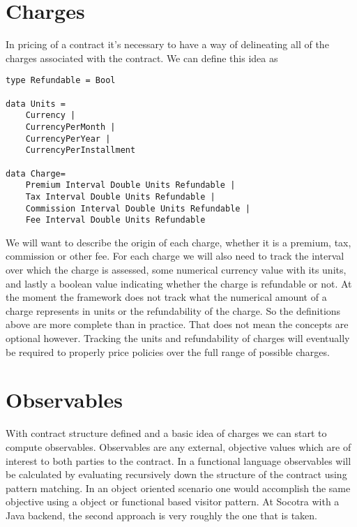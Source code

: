\section{Charges}
\label{sec:01:2}
In pricing of a contract it's necessary to have a way of delineating all of the charges associated with the contract. We can
define this idea as
\begin{lstlisting}
type Refundable = Bool

data Units = 
    Currency | 
    CurrencyPerMonth | 
    CurrencyPerYear | 
    CurrencyPerInstallment

data Charge= 
    Premium Interval Double Units Refundable |
    Tax Interval Double Units Refundable |
    Commission Interval Double Units Refundable |
    Fee Interval Double Units Refundable
\end{lstlisting}
We will want to describe the origin of each charge, whether it is a premium, tax, commission or other
fee. For each charge we will also need to track the
interval over which the charge is assessed, some numerical currency value with its units, and lastly a boolean value
indicating whether the charge is refundable or not. At the moment the framework does not track what the numerical
amount of a charge represents in units or the refundability of the charge. So the definitions above are more
complete than in practice. That does not mean the concepts are optional however. Tracking the units and
refundability of charges will eventually be required to properly price policies over the full range of possible charges.

\section{Observables}
\label{sec:01:3}
With contract structure defined and a basic idea of charges we can start to compute
observables. Observables are any external, objective values which are of interest to both parties
to the contract. In a functional language observables will be calculated by evaluating recursively down
the structure of the contract using pattern matching. In an object oriented scenario one would accomplish
the same objective using a object or functional based visitor pattern. At Socotra with a Java backend, the
second approach is very roughly the one that is taken.

